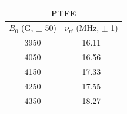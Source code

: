 \begin{tabular}{cc}
\hline
\multicolumn{2}{c}{PTFE} \\
\hline
$B_0$ (G, $\pm$ 50) & $\nu_{\mathrm{rf}}$ (MHz, $\pm$ 1) \\
\hline
3950 & 16.11 \\
4050 & 16.56 \\
4150 & 17.33 \\
4250 & 17.55 \\
4350 & 18.27 \\
\hline
\end{tabular}
